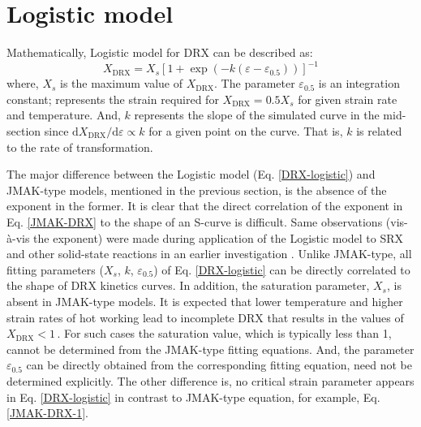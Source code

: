 \documentclass[a4paper, 11pt, dvipsnames]{article}
\begin{document}
\section{Logistic model}
Mathematically, Logistic model for DRX can be described as:
\begin{equation}\label{DRX-logistic}
X_\text{DRX} = X_s \left[1 + \exp(-k(\varepsilon-\varepsilon_{0.5}))\right]^{-1}
\end{equation}
where, $X_s$ is the maximum value of $X_{\text{DRX}}$. The parameter $\varepsilon_{0.5}$ is an integration constant; represents the strain required for $X_{\text{DRX}} = 0.5X_s$ for given strain rate and temperature. And, $k$ represents the slope of the simulated curve in the mid-section since $\text{d}X_{\text{DRX}}/\text{d}\varepsilon \propto k$ for a given point on the curve. That is, $k$ is related to the rate of transformation.

The major difference between the Logistic model (Eq. \eqref{DRX-logistic}) and {\small JMAK}-type models, mentioned in the previous section, is the absence of the exponent in the former. It is clear that the direct correlation of the exponent in Eq. \eqref{JMAK-DRX} to the shape of an S-curve is difficult. Same observations (vis-\`{a}-vis the exponent) were made during application of the Logistic model to SRX and other solid-state reactions in an earlier investigation \cite{Y1}. Unlike JMAK-type, all fitting parameters ($X_s$, $k$, $\varepsilon_{0.5}$) of Eq. \eqref{DRX-logistic} can be directly correlated to the shape of DRX kinetics curves. In addition, the saturation parameter, $X_s$, is absent in {\small JMAK}-type models. It is expected that lower temperature and higher strain rates of hot working lead to incomplete DRX that results in the values of $X_{\text{DRX}} < 1\,$. For such cases the saturation value, which is typically less than 1, cannot be determined from the JMAK-type fitting equations. And, the parameter $\varepsilon_{0.5}$ can be directly obtained from the corresponding fitting equation, need not be determined explicitly. The other difference is, no critical strain parameter appears in Eq. \eqref{DRX-logistic} in contrast to {\small JMAK}-type equation, for example, Eq. \eqref{JMAK-DRX-1}.
\end{document}
